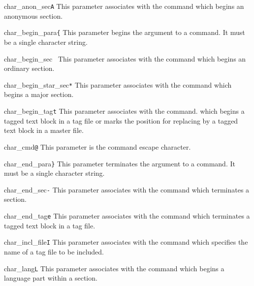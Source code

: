 \begin{describepara}{char_anon_sec}{\verb*|A|}\describe
This parameter associates with the  command
which begins an anonymous section. 
\end{describepara}
\begin{describepara}{char_begin_para}{\verb*|{|}\describe
This parameter begins the argument to a command. It must be a single
character string.
\end{describepara}
\begin{describepara}{char_begin_sec}{\verb*| |}\describe
This parameter associates with the  command
which begins an ordinary section. 
\end{describepara}
\begin{describepara}{char_begin_star_sec}{\verb*|*|}\describe
This parameter associates with the  command
which begins a major section. 
\end{describepara}
\begin{describepara}{char_begin_tag}{\verb*|t|}\describe
This parameter associates with the  command.
which begins a tagged text block in a tag file or marks the position
for replacing by a tagged text block in a master file.
\end{describepara}
\begin{describepara}{char_cmd}{\verb*|@|}\describe
This parameter is the command escape character.
\end{describepara}
\begin{describepara}{char_end_para}{\verb*|}|}\describe
This parameter terminates the argument to a command. It must be a single
character string.
\end{describepara}
\begin{describepara}{char_end_sec}{\verb*|-|}\describe
This parameter associates with the  command
which terminates a section. 
\end{describepara}
\begin{describepara}{char_end_tag}{\verb*|e|}\describe
This parameter associates with the  command
which terminates a tagged text block in a tag file.
\end{describepara}
\begin{describepara}{char_incl_file}{\verb*|I|}\describe
This parameter associates with the  command
which specifies the name of a tag file to be included.
\end{describepara}
\begin{describepara}{char_lang}{\verb*|L|}\describe
This parameter associates with the  command
which begins a language part within a section. 
\end{describepara}
